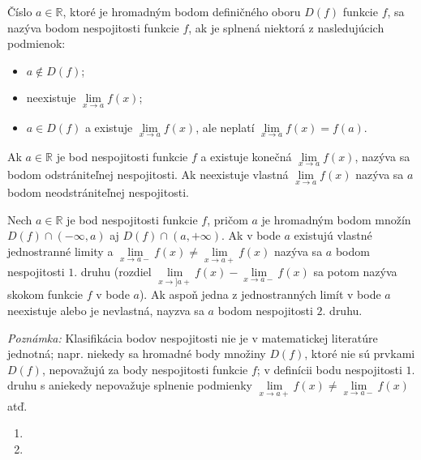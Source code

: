 Číslo $a \in \mathbb{R}$, ktoré je hromadným bodom definičného oboru $D(f)$
funkcie $f$, sa nazýva bodom nespojitosti funkcie $f$, ak je splnená niektorá z
nasledujúcich podmienok:
\begin{itemize}
\item $a \notin D(f)$;
\item neexistuje $\lim\limits_{x \rightarrow a}f(x)$;
\item $a \in D(f)$ a existuje $\lim\limits_{x \rightarrow a}f(x)$, ale neplatí
      $\lim\limits_{x \rightarrow a}f(x)=f(a)$.
\end{itemize}

Ak $a \in \mathbb{R}$ je bod nespojitosti funkcie $f$ a existuje konečná
$\lim\limits_{x \rightarrow a}f(x)$, nazýva sa bodom odstrániteľnej
nespojitosti. Ak neexistuje vlastná $\lim\limits_{x \rightarrow a}f(x)$ nazýva
sa $a$ bodom neodstrániteľnej nespojitosti.

Nech $a \in \mathbb{R}$ je bod nespojitosti funkcie $f$, pričom $a$ je hromadným
bodom množín $D(f) \cap (-\infty,a)$ aj $D(f)\cap (a,+\infty)$. Ak v bode $a$
existujú vlastné jednostranné limity a $\lim\limits_{x \rightarrow a-}f(x) \neq
\lim\limits_{x \rightarrow a+}f(x)$ nazýva sa $a$ bodom nespojitosti $1.$ druhu
(rozdiel $\lim\limits_{x \rightarrow] a+}f(x)-\lim\limits_{x \rightarrow
a-}f(x)$ sa potom nazýva skokom funkcie $f$ v bode $a$). Ak aspoň jedna z
jednostranných limít v bode $a$ neexistuje alebo je nevlastná, nayzva sa $a$
bodom nespojitosti $2.$ druhu.

\textit{Poznámka:}
Klasifikácia bodov nespojitosti nie je v matematickej literatúre jednotná; napr.
niekedy sa hromadné body množiny $D(f)$, ktoré nie sú prvkami $D(f)$, nepovažujú
za body nespojitosti funkcie $f$; v definícii bodu nespojitosti $1.$ druhu s
aniekedy nepovažuje splnenie podmienky $\lim\limits_{x \rightarrow a+}f(x) \neq
\lim\limits_{x \rightarrow a-}f(x)$ atď.

\begin{enumerate}[resume]
  \item {}
  \item {}
\end{enumerate}
